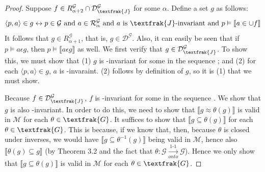\documentclass{article}
\newcommand{\lbc}{\llbracket}
\newcommand{\rbc}{\rrbracket}
\let\biconditional\leftrightarrow
\theoremstyle{definition}
\begin{document}
\begin{proof}
Suppose $f\in R^\mathcal{G}_{\alpha+2}\cap\mathcal{D}^\mathcal{G}_\textfrak{J}$ for some $\alpha$. Define a set $g$ as follows:
\[ \langle p,a\rangle\in g\biconditional p\in\mathcal{G}\textrm{ and }a\in\mathcal{R}^\mathcal{G}_\alpha\textrm{ and }
a\textrm{ is }\textfrak{J}\textrm{-invariant}\textrm{ and }p\vDash\lbc a\in\cup f\rbc \]
It follows that $g\in R^\mathcal{G}_{\alpha+1}$, that is, $g\in\mathcal{D}^\mathcal{G}$. Also, it can easily be seen that if
$p\vDash a\epsilon g$, then $p\vDash\lbc a\epsilon g\rbc$ as well. We first verify that 
$g\in\mathcal{D}^\mathcal{G}_\textfrak{J}$. To show this, we must show that (1) 
$g$ is -invariant for some  in the sequence ; and (2) for each 
$\langle p,a\rangle\in g$, $a$ is -invaraint. (2) follows by definition of $g$, so it is (1) that we must 
show.

Because $f\in\mathcal{D}^\mathcal{G}_\textfrak{J}$, $f$ is -invariant for some 
 in the sequence . We show that $g$ is also -invariant. In order to do this, we 
need to show that $\lbc g\approx\theta(g)\rbc$ is valid in $\mathcal{M}$ for each $\theta\in\textfrak{G}$. It suffices to show that
$\lbc g\subseteq\theta(g)\rbc$ for each $\theta\in\textfrak{G}$. This is because, if we know that, then, because 
$\theta$ is closed under inverses, we would have
$\lbc g\subseteq\theta^{-1}(g)\rbc$ being valid in $\mathcal{M}$, hence also
$\lbc \theta(g)\subseteq g\rbc$ (by Theorem 3.2 and the fact that
$\theta:\mathcal{G}\xrightarrow[onto]{\text{1-1}}\mathcal{G}$). Hence we only show that $\lbc g\subseteq\theta(g)\rbc$ is valid in 
$\mathcal{M}$ for each $\theta\in\textfrak{G}$.


\end{proof}
\end{document}
